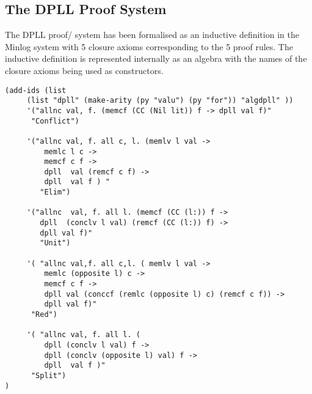 \subsection*{The DPLL Proof System}
The DPLL proof/ system has been formalised as an inductive definition in the Minlog system with 5 closure axioms corresponding to the 5 proof rules. The inductive definition is represented internally as an algebra with the names of the closure axioms being used as constructors.

\begin{lstlisting}[caption = "The DPLL Proof System as an Inductive Definition in Minlog"]
(add-ids (list 
     (list "dpll" (make-arity (py "valu") (py "for")) "algdpll" ))
     '("allnc val, f. (memcf (CC (Nil lit)) f -> dpll val f)"
      "Conflict")

     '("allnc val, f. all c, l. (memlv l val ->                                                                                                             
         memlc l c ->                                                                                                                     
         memcf c f ->                                                                                                                     
         dpll  val (remcf c f) ->                                                                                                         
         dpll  val f ) "
        "Elim")

     '("allnc  val, f. all l. (memcf (CC (l:)) f ->                                                                                                         
        dpll  (conclv l val) (remcf (CC (l:)) f) ->                                                                                        
        dpll val f)"
        "Unit")

     '( "allnc val,f. all c,l. ( memlv l val ->                                                                                                             
         memlc (opposite l) c ->                                                                                                         
         memcf c f ->                                                                                                                    
         dpll val (conccf (remlc (opposite l) c) (remcf c f)) ->                                                                         
         dpll val f)"
      "Red")

     '( "allnc val, f. all l. (                                                                                                                             
         dpll (conclv l val) f ->                                                                                                         
         dpll (conclv (opposite l) val) f ->                                                                                              
         dpll  val f )"
      "Split")
)
\end{lstlisting}

